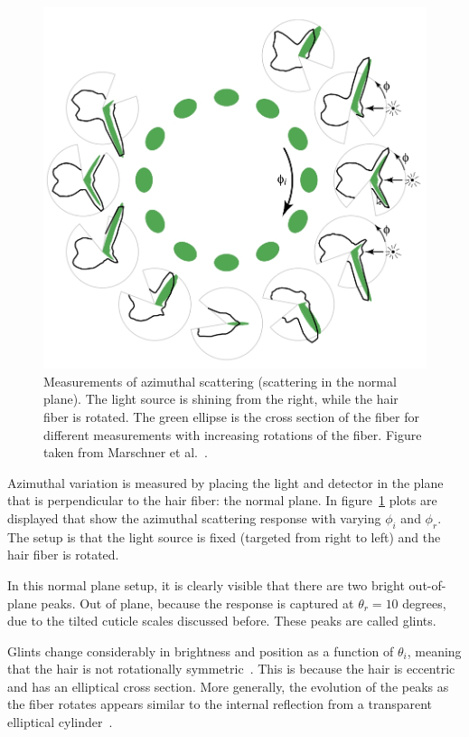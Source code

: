 \documentclass[11pt,a4paper]{report}
\begin{document}
\begin{figure}[h]
\begin{center}
\includegraphics[scale=0.4]{images/azimuthal_measurement.jpeg}
\caption{Measurements of azimuthal scattering (scattering in the normal plane). The light source is shining from the right, while the hair fiber is rotated. The green ellipse is the cross section of the fiber for different measurements with increasing rotations of the fiber. Figure taken from Marschner et al.~\cite{marschner}.}
\label{fig_azimuthal_marschner}
\end{center}
\end{figure}


Azimuthal variation is measured by placing the light and detector in the plane that is perpendicular to the hair fiber: the normal plane. In figure~\ref{fig_azimuthal_marschner} plots are displayed that show the azimuthal scattering response with varying $\phi_i$ and $\phi_r$. The setup is that the light source is fixed (targeted from right to left) and the hair fiber is rotated. 

In this normal plane setup, it is clearly visible that there are two bright out-of-plane peaks. Out of plane, because the response is captured at $\theta_r = 10$ degrees, due to the tilted cuticle scales discussed before. These peaks are called glints.

Glints change considerably in brightness and position as a function of $\theta_i$,  meaning that the hair is not rotationally symmetric~\cite{marschner}. This is because the hair is eccentric and has an elliptical cross section. More generally, the evolution of the peaks as the fiber rotates appears similar to the internal reflection from a transparent elliptical cylinder~\cite{marschner}.
\end{document}
